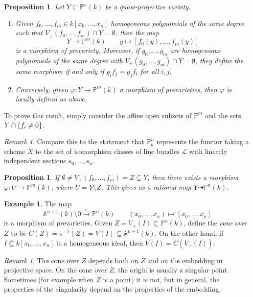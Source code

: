 \documentclass[leqno, openany]{memoir}
\newtheorem{prop}[thm]{Proposition}
\theoremstyle{definition}
\newtheorem{exm}[thm]{Example}
\theoremstyle{remark}
\newtheorem{rmk}[thm]{Remark}
\theoremstyle{plain}
\theoremstyle{definition}
\theoremstyle{remark}
\newcommand{\A}{\mathbb{A}}
\renewcommand{\P}{\mathbb{P}}
\newcommand{\mc}[1]{\mathcal{#1}}
\newcommand{\ol}[1]{\overline{#1}}
\begin{document}
\begin{prop}
    Let $Y \subseteq \P^n(k)$ be a quasi-projective variety. 
    \begin{enumerate}
        \item Given $f_0, \ldots, f_m \in k[x_0, \ldots, x_n]$ homogeneous polynomials of the same degree such that $V_+(f_0, \ldots, f_m) \cap Y = \emptyset$, then the map
            \[ Y \to \P^m(k) \qquad y \mapsto [f_0(y), \ldots, f_m(y)] \]
            is a morphism of prevariety. Moreover, if $g_0, \ldots, g_m$ are homogeneous polynomails of the same degree with $V_+(g_0, \ldots, g_m) \cap Y = \emptyset$, they define the same morphism if and only if $g_i f_j = g_j f_i$ for all $i,j$.
        \item Conversely, given $\varphi \colon Y \to \P^m(k)$ a morphism of prevarieties, then $\varphi$ is locally defined as above.
    \end{enumerate}
\end{prop}

To prove this result, simply consider the affine open subsets of $\P^m$ and the sets $Y \cap \qty{f_i \neq 0}$.

\begin{rmk}
    Compare this to the statement that $\P^n_k$ represents the functor taking a scheme $X$ to the set of isomorphism classes of line bundles $\mc{L}$ with linearly independent sections $s_0, \ldots, s_n$.
\end{rmk}

\begin{prop}
    If $\emptyset \neq V_+(f_0, \ldots, f_m) = Z \subsetneq Y$, then there exists a morphism $\varphi \colon U \to \P^m(k)$, where $U = Y \setminus Z$. This gives us a \textit{rational map} $Y \dashrightarrow \P^n(k)$.
\end{prop}

\begin{exm}
    The map 
    \[ \A^{n+1}(k) \setminus \qty{0} \xrightarrow{\pi} \P^n(k) \qquad (x_0, \ldots, x_n) \mapsto [x_0, \ldots, x_n] \]
    is a morphism of prevarieties. Given $Z = V_+(I) \subseteq \P^n(k)$, define the \textit{cone} over $Z$ to be $C(Z) = \ol{\pi^{-1}(Z)} = V(I) \subseteq \A^{n+1}(k)$. On the other hand, if $I \subseteq k[x_0, \ldots, x_n]$ is a homogeneous ideal, then $V(I) = C(V_+(I))$.
\end{exm}

\begin{rmk}
    The cone over $Z$ depends both on $Z$ and on the embedding in projective space. On the cone over $Z$, the origin is usually a singular point. Sometimes (for example when $Z$ is a point) it is not, but in general, the properties of the singularity depend on the properties of the embedding.
\end{rmk}
\end{document}
